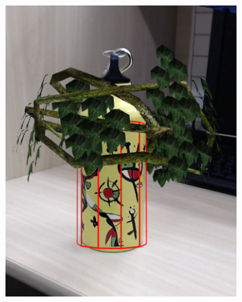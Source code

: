 \documentclass[annual]{acmsiggraph}
\begin{document}
\begin{figure}[h]
\center
\begin{subfigure}[c]{0.33\columnwidth} \includegraphics[width=0.98\textwidth]{images/res3D_cy1.png} \end{subfigure}%

\end{figure}
\end{document}
